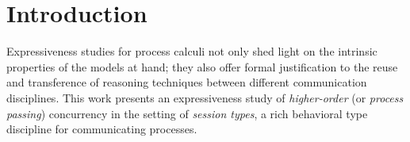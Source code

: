 \section{Introduction}
Expressiveness studies for process calculi not only shed light on the intrinsic properties of the models at hand; they
also offer formal justification to the reuse and transference of reasoning techniques between different communication disciplines.
This work presents an expressiveness study of \emph{higher-order} (or \emph{process passing}) concurrency in the setting of \emph{session types}, 
a rich behavioral type discipline for communicating processes. 